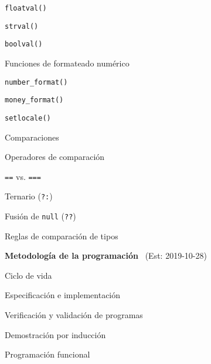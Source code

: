 \begin{longenum}
\begin{longenum}
\begin{longenum}
\begin{longenum}
\begin{longenum}
                    \item \texttt{floatval()}
                    \item \texttt{strval()}
                    \item \texttt{boolval()}
                \end{longenum}
                \item Funciones de formateado numérico
                \begin{longenum}
                    \item \texttt{number\_format()}
                    \item \texttt{money\_format()}
                    \begin{longenum}
                        \item \texttt{setlocale()}
                    \end{longenum}
                \end{longenum}
            \end{longenum}
            \item Comparaciones
            \begin{longenum}
                \item Operadores de comparación
                \item \texttt{==} vs. \texttt{===}
                \item Ternario (\texttt{?:})
                \item Fusión de \texttt{null} (\texttt{??})
                \item Reglas de comparación de tipos
            \end{longenum}
        \end{longenum}
    \end{longenum}
    \item \textbf{Metodología de la programación} \ (Est: 2019-10-28)
    \begin{longenum}
        \item Ciclo de vida
        \item Especificación e implementación
        \item Verificación y validación de programas
        \begin{longenum}
            \item Demostración por inducción
        \end{longenum}
        \item Programación funcional
        \begin{longenum}

\end{longenum}
\end{longenum}
\end{longenum}
